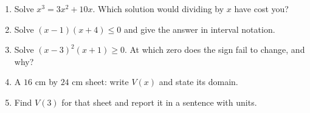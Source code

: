 \documentclass[aspectratio=169, 11pt]{beamer}
\begin{document}
\begin{frame}[t, plain]

  \begin{enumerate}\setlength{\itemsep}{10pt}
    \item Solve \(x^3 = 3x^2 + 10x\). Which solution would dividing by \(x\)
          have cost you?
    \item Solve \((x-1)(x+4) \le 0\) and give the answer in interval notation.
    \item Solve \((x-3)^2(x+1) \ge 0\). At which zero does the sign fail to
          change, and why?
    \item A \(16\) cm by \(24\) cm sheet: write \(V(x)\) and state its domain.
    \item Find \(V(3)\) for that sheet and report it in a sentence with units.
  \end{enumerate}
\end{frame}
\end{document}

